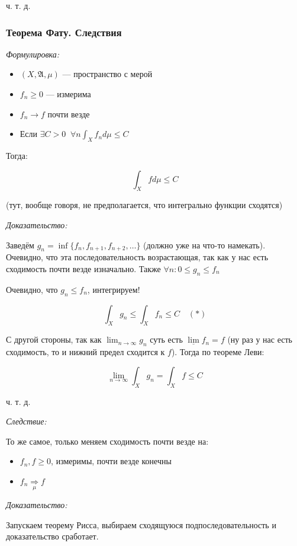 \documentclass{article}
\def\dbl{\,\,}
\begin{document}
ч. т. д.

\subsubsection{Теорема Фату. Следствия}
\textit{Формулировка:}

\begin{itemize}
    \item $(X, \mathfrak{A}, \mu)$ --- пространство с мерой
    \item $f_n \ge 0$ --- измерима
    \item $f_n \rightarrow f$ почти везде
    \item Если $\exists C > 0\ \dbl \forall n \int_{X} f_n d\mu \le C$  
\end{itemize}

Тогда:

\[\int_{X} f d\mu \le C\]

(тут, вообще говоря, не предполагается, что интегрально функции сходятся)

\textit{Доказательство:}

Заведём $g_n = \inf \{f_n, f_{n + 1}, f_{n + 2}, \ldots\}$ (должно уже на что-то намекать). Очевидно, что эта последовательность возрастающая, так как у нас есть сходимость почти везде изначально. Также $\forall n : 0 \le g_n \le f_n$

Очевидно, что $g_n \le f_n$, интегрируем!

\[\int_{X} g_n \le \int_{X} f_n \le C \quad (*)\]

С другой стороны, так как $\lim_{n \rightarrow \infty} g_n$ суть есть $\underline{\lim} f_n = f$ (ну раз у нас есть сходимость, то и нижний предел сходится к $f$). Тогда по теореме Леви:

\[\lim_{n \rightarrow \infty} \int_{X} g_n = \int_{X} f \le C\]

ч. т. д.

\textit{Следствие: }

То же самое, только меняем сходимость почти везде на: 

\begin{itemize}
    \item $f_n, f \ge 0$, измеримы, почти везде конечны
    \item $f_n \underset{\mu}{\Longrightarrow} f$
\end{itemize}

\textit{Доказательство: }

Запускаем теорему Рисса, выбираем сходящуюся подпоследовательность и доказательство сработает.
\end{document}
